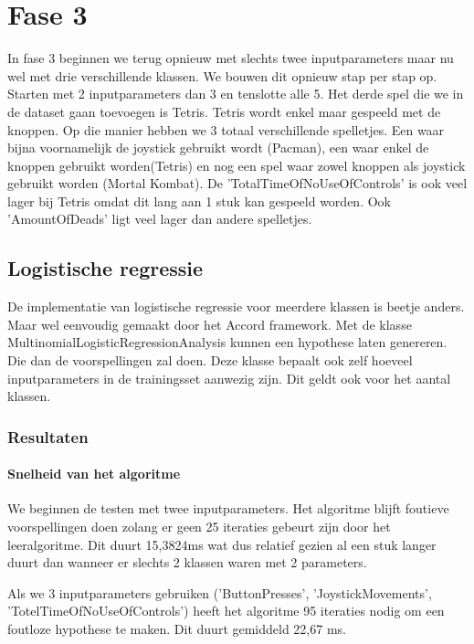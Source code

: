 
\newpage
\section{Fase 3}
\label{sec:Fase3}

In fase 3 beginnen we terug opnieuw met slechts twee inputparameters maar nu wel met drie verschillende klassen. We bouwen dit opnieuw stap per stap op. Starten met 2 inputparameters dan 3 en tenslotte alle 5. Het derde spel die we in de dataset gaan toevoegen is Tetris. Tetris wordt enkel maar gespeeld met de knoppen. Op die manier hebben we 3 totaal verschillende spelletjes. Een waar bijna voornamelijk de joystick gebruikt wordt (Pacman), een waar enkel de knoppen gebruikt worden(Tetris) en nog een spel waar zowel knoppen als joystick gebruikt worden (Mortal Kombat). De 'TotalTimeOfNoUseOfControls' is ook veel lager bij Tetris omdat dit lang aan 1 stuk kan gespeeld worden. Ook 'AmountOfDeads' ligt veel lager dan andere spelletjes. 


\subsection{Logistische regressie}
\label{sec:Logistischeregressie-fase3}

De implementatie van logistische regressie voor meerdere klassen is beetje anders. Maar wel eenvoudig gemaakt door het Accord framework. Met de klasse MultinomialLogisticRegressionAnalysis kunnen een hypothese laten genereren. Die dan de voorspellingen zal doen. Deze klasse bepaalt ook zelf hoeveel inputparameters  in de trainingsset aanwezig zijn. Dit geldt ook voor het aantal klassen.

\subsubsection{Resultaten}
\paragraph{Snelheid van het algoritme} 
We beginnen de testen met twee inputparameters. Het algoritme blijft foutieve voorspellingen doen zolang er geen 25 iteraties gebeurt zijn door het leeralgoritme. Dit duurt 15,3824ms wat dus relatief gezien al een stuk langer duurt dan wanneer er slechts 2 klassen waren met 2 parameters. 

Als we 3 inputparameters gebruiken ('ButtonPresses', 'JoystickMovements', 'TotelTimeOfNoUseOfControls') heeft het algoritme 95 iteraties nodig om een foutloze hypothese te maken. Dit duurt gemiddeld 22,67 ms. 

